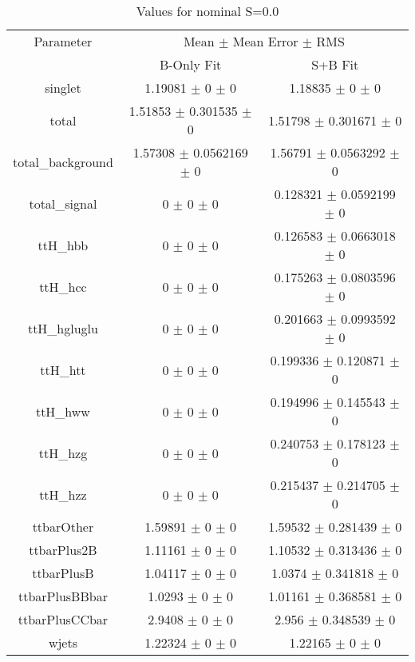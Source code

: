 \begin{table}
\centering
\caption{Values for nominal S=0.0}
\begin{tabular}{ccc}
\toprule
Parameter & \multicolumn{2}{c}{Mean $\pm$ Mean Error $\pm$ RMS}\\
 & B-Only Fit & S+B Fit\\
\midrule
singlet & \num{1.19081} $\pm$ \num{0} $\pm$ \num{0} & \num{1.18835} $\pm$ \num{0} $\pm$ \num{0}\\
total & \num{1.51853} $\pm$ \num{0.301535} $\pm$ \num{0} & \num{1.51798} $\pm$ \num{0.301671} $\pm$ \num{0}\\
total\_background & \num{1.57308} $\pm$ \num{0.0562169} $\pm$ \num{0} & \num{1.56791} $\pm$ \num{0.0563292} $\pm$ \num{0}\\
total\_signal & \num{0} $\pm$ \num{0} $\pm$ \num{0} & \num{0.128321} $\pm$ \num{0.0592199} $\pm$ \num{0}\\
ttH\_hbb & \num{0} $\pm$ \num{0} $\pm$ \num{0} & \num{0.126583} $\pm$ \num{0.0663018} $\pm$ \num{0}\\
ttH\_hcc & \num{0} $\pm$ \num{0} $\pm$ \num{0} & \num{0.175263} $\pm$ \num{0.0803596} $\pm$ \num{0}\\
ttH\_hgluglu & \num{0} $\pm$ \num{0} $\pm$ \num{0} & \num{0.201663} $\pm$ \num{0.0993592} $\pm$ \num{0}\\
ttH\_htt & \num{0} $\pm$ \num{0} $\pm$ \num{0} & \num{0.199336} $\pm$ \num{0.120871} $\pm$ \num{0}\\
ttH\_hww & \num{0} $\pm$ \num{0} $\pm$ \num{0} & \num{0.194996} $\pm$ \num{0.145543} $\pm$ \num{0}\\
ttH\_hzg & \num{0} $\pm$ \num{0} $\pm$ \num{0} & \num{0.240753} $\pm$ \num{0.178123} $\pm$ \num{0}\\
ttH\_hzz & \num{0} $\pm$ \num{0} $\pm$ \num{0} & \num{0.215437} $\pm$ \num{0.214705} $\pm$ \num{0}\\
ttbarOther & \num{1.59891} $\pm$ \num{0} $\pm$ \num{0} & \num{1.59532} $\pm$ \num{0.281439} $\pm$ \num{0}\\
ttbarPlus2B & \num{1.11161} $\pm$ \num{0} $\pm$ \num{0} & \num{1.10532} $\pm$ \num{0.313436} $\pm$ \num{0}\\
ttbarPlusB & \num{1.04117} $\pm$ \num{0} $\pm$ \num{0} & \num{1.0374} $\pm$ \num{0.341818} $\pm$ \num{0}\\
ttbarPlusBBbar & \num{1.0293} $\pm$ \num{0} $\pm$ \num{0} & \num{1.01161} $\pm$ \num{0.368581} $\pm$ \num{0}\\
ttbarPlusCCbar & \num{2.9408} $\pm$ \num{0} $\pm$ \num{0} & \num{2.956} $\pm$ \num{0.348539} $\pm$ \num{0}\\
wjets & \num{1.22324} $\pm$ \num{0} $\pm$ \num{0} & \num{1.22165} $\pm$ \num{0} $\pm$ \num{0}\\
\bottomrule
\end{tabular}
\end{table}